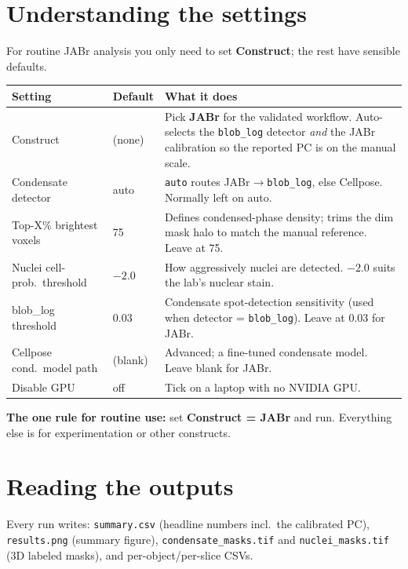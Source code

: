 \documentclass[11pt]{article}
\newcommand{\code}[1]{\texttt{\small #1}}
\begin{document}
\section{Understanding the settings}
For routine JABr analysis you only need to set \textbf{Construct}; the rest have
sensible defaults.

\renewcommand{\arraystretch}{1.25}
\begin{longtable}{>{\raggedright}p{3.4cm} >{\raggedright}p{1.6cm} p{8.5cm}}
\toprule
\textbf{Setting} & \textbf{Default} & \textbf{What it does}\\
\midrule
\endhead
Construct & (none) & Pick \textbf{JABr} for the validated workflow. Auto-selects the \code{blob\_log} detector \emph{and} the JABr calibration so the reported PC is on the manual scale.\\
Condensate detector & auto & \code{auto} routes JABr$\rightarrow$\code{blob\_log}, else Cellpose. Normally left on auto.\\
Top-X\% brightest voxels & 75 & Defines condensed-phase density; trims the dim mask halo to match the manual reference. Leave at 75.\\
Nuclei cell-prob.\ threshold & $-2.0$ & How aggressively nuclei are detected. $-2.0$ suits the lab's nuclear stain.\\
blob\_log threshold & 0.03 & Condensate spot-detection sensitivity (used when detector = \code{blob\_log}). Leave at 0.03 for JABr.\\
Cellpose cond.\ model path & (blank) & Advanced; a fine-tuned condensate model. Leave blank for JABr.\\
Disable GPU & off & Tick on a laptop with no NVIDIA GPU.\\
\bottomrule
\end{longtable}

\noindent\textbf{The one rule for routine use:} set \textbf{Construct = JABr} and
run. Everything else is for experimentation or other constructs.

\section{Reading the outputs}
Every run writes: \code{summary.csv} (headline numbers incl.\ the calibrated PC),
\code{results.png} (summary figure), \code{condensate\_masks.tif} and
\code{nuclei\_masks.tif} (3D labeled masks), and per-object/per-slice CSVs.
\end{document}
